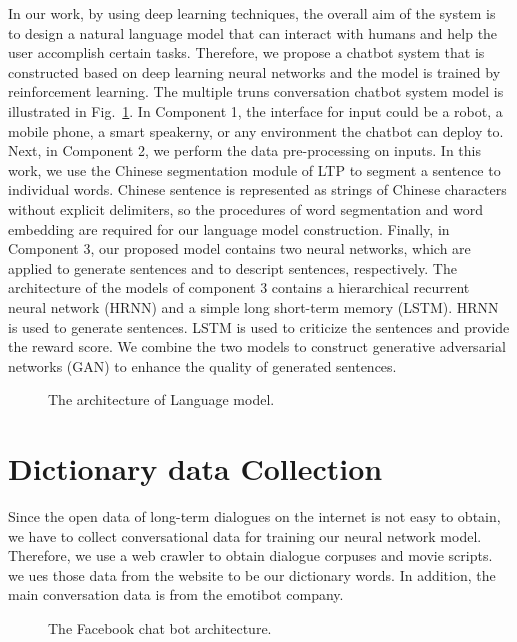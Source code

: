 In our work, by using deep learning techniques, the overall aim of the system is to design a natural language model that can interact with humans and help the user accomplish certain tasks. Therefore, we propose a chatbot system that is constructed based on deep learning neural networks and the model is trained by reinforcement learning. The multiple truns conversation chatbot system model is illustrated in Fig.~\ref{fig:SystemDesign}. In Component 1, the interface for input could be a robot, a mobile phone, a smart speakerny, or any environment the chatbot can deploy to. Next, in Component 2, we perform the data pre-processing on inputs. In this work, we use the Chinese segmentation module of LTP\cite{LTP} to segment a sentence to individual words. Chinese sentence is represented as strings of Chinese characters without explicit delimiters, so the procedures of word segmentation and word embedding are required for our language model construction. Finally, in Component 3, our proposed model contains two neural networks, which are applied to generate sentences and to descript sentences, respectively. The architecture of the models of component 3 contains a hierarchical recurrent neural network (HRNN) and a simple long short-term memory (LSTM). HRNN is used to generate sentences. LSTM is used to criticize the sentences and provide the reward score. We combine the two models to construct generative adversarial networks (GAN) to enhance the quality of generated sentences.

\begin{figure}[h]
\centerline{}
\caption{The architecture of Language model.}
\label{fig:SystemDesign}
\end{figure}

\section{Dictionary data Collection}
Since the open data of long-term dialogues on the internet is not easy to obtain, we have to collect conversational data for training our neural network model. Therefore, we use a web crawler to obtain dialogue corpuses and movie scripts. we ues those data from the website to be our dictionary words. In addition, the main conversation data is from the emotibot company.

\begin{figure}[h]
\centerline{}
\caption{The Facebook chat bot architecture.}
\label{fig:FBChatbot}
\end{figure}

